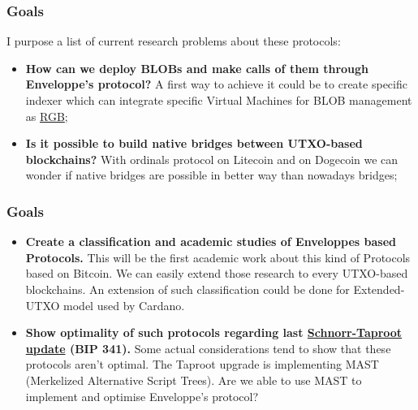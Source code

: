 \documentclass[hyperref={colorlinks=true}]{beamer}
\begin{document}
\begin{frame}
\frametitle{Goals}

\begin{center}

{\Large I purpose a list of current research problems about these protocols}: \\
\vspace{0.3cm}

\begin{itemize}

\item {\bf How can we deploy BLOBs and make calls of them through Enveloppe's protocol?} A first way to achieve it could be to create specific indexer which can integrate specific Virtual Machines for BLOB management as \href{https://www.rgbfaq.com/rgb-paradigms}{RGB};\\

\item {\bf Is it possible to build native bridges between UTXO-based blockchains?} With ordinals protocol on Litecoin and on Dogecoin we can wonder if native bridges are possible in better way than nowadays bridges;\\

\end{itemize}

\end{center}

\end{frame}

\begin{frame}
\frametitle{Goals}

\begin{center}

\begin{itemize}

\item {\bf Create a classification and academic studies of Enveloppes based Protocols.} This will be the first academic work about this kind of Protocols based on Bitcoin. We can easily extend those research to every UTXO-based blockchains. An extension of such classification could be done for Extended-UTXO model used by Cardano.\\

\item {\bf Show optimality of such protocols regarding last \href{https://github.com/bitcoin/bips/blob/master/bip-0341.mediawiki}{Schnorr-Taproot update} (BIP 341).} Some actual considerations tend to show that these protocols aren't optimal. The Taproot upgrade is implementing MAST (Merkelized Alternative Script Trees). Are we able to use MAST to implement and optimise Enveloppe's protocol?  

\end{itemize}

\end{center}

\end{frame}
\end{document}
